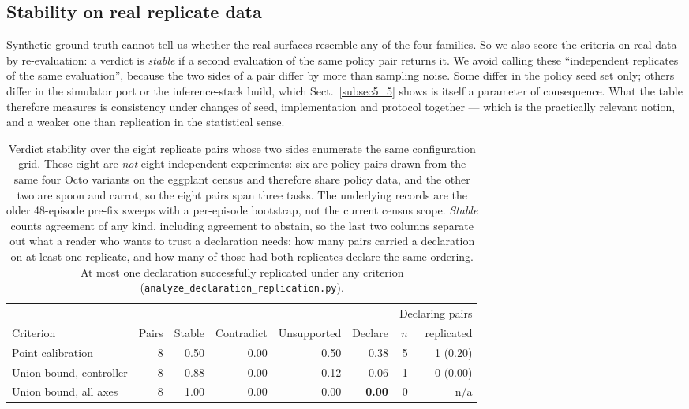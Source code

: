 \documentclass[pdflatex,iicol,sn-apa]{sn-jnl}
\theoremstyle{remark}
\begin{document}
\subsection{Stability on real replicate data}\label{subsec8_3}

Synthetic ground truth cannot tell us whether the real surfaces resemble any of the four families.
So we also score the criteria on real data by re-evaluation: a verdict is \emph{stable} if a second
evaluation of the same policy pair returns it. We avoid calling these ``independent replicates of
the same evaluation'', because the two sides of a pair differ by more than sampling noise. Some
differ in the policy seed set only; others differ in the simulator port or the inference-stack
build, which Sect.~\ref{subsec5_5} shows is itself a parameter of consequence. What the table
therefore measures is consistency under changes of seed, implementation and protocol together ---
which is the practically relevant notion, and a weaker one than replication in the statistical
sense.

\begin{table}[t]
\caption{Verdict stability over the eight replicate pairs whose two sides enumerate the same
configuration grid. These eight are \emph{not} eight independent experiments: six are policy pairs
drawn from the same four Octo variants on the eggplant census and therefore share policy data, and
the other two are spoon and carrot, so the eight pairs span three tasks. The underlying records are
the older 48-episode pre-fix sweeps with a per-episode bootstrap, not the current census scope.
\emph{Stable} counts agreement of any kind, including agreement to abstain, so the last two columns
separate out what a reader who wants to trust a declaration needs: how many pairs carried a
declaration on at least one replicate, and how many of those had both replicates declare the same
ordering. At most one declaration successfully replicated under any criterion
(\texttt{analyze\_declaration\_replication.py}).}\label{tab8}
\begin{tabular}{@{}lrrrrrrr@{}}
\toprule
 & & & & & & \multicolumn{2}{c}{Declaring pairs} \\
\cmidrule(l){7-8}
Criterion & Pairs & Stable & Contradict & Unsupported & Declare & $n$ & replicated \\
\midrule
Point calibration & 8 & 0.50 & 0.00 & 0.50 & 0.38 & 5 & 1 (0.20) \\
Union bound, controller & 8 & 0.88 & 0.00 & 0.12 & 0.06 & 1 & 0 (0.00) \\
Union bound, all axes & 8 & 1.00 & 0.00 & 0.00 & \textbf{0.00} & 0 & n/a \\
\bottomrule
\end{tabular}
\end{table}
\end{document}
